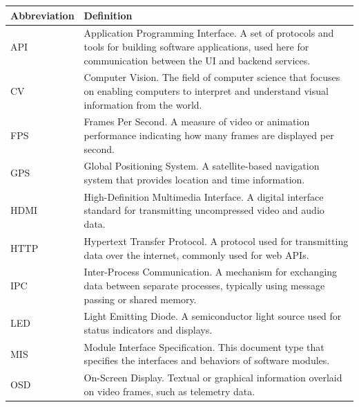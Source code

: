 \documentclass[12pt, titlepage]{article}
\begin{document}
\begin{table}[h]
  \centering
  \begin{tabular}{p{3cm} p{10cm}}
    \toprule
    \textbf{Abbreviation} & \textbf{Definition}                                                                                                                                                  \\
    \midrule
    API                   & Application Programming Interface. A set of protocols and tools for building software applications, used here for communication between the UI and backend services. \\
    CV                    & Computer Vision. The field of computer science that focuses on enabling computers to interpret and understand visual information from the world.                     \\
    FPS                   & Frames Per Second. A measure of video or animation performance indicating how many frames are displayed per second.                                                  \\
    GPS                   & Global Positioning System. A satellite-based navigation system that provides location and time information.                                                          \\
    HDMI                  & High-Definition Multimedia Interface. A digital interface standard for transmitting uncompressed video and audio data.                                               \\
    HTTP                  & Hypertext Transfer Protocol. A protocol used for transmitting data over the internet, commonly used for web APIs.                                                    \\
    IPC                   & Inter-Process Communication. A mechanism for exchanging data between separate processes, typically using message passing or shared memory.                           \\
    LED                   & Light Emitting Diode. A semiconductor light source used for status indicators and displays.                                                                          \\
    MIS                   & Module Interface Specification. This document type that specifies the interfaces and behaviors of software modules.                                                  \\
    OSD                   & On-Screen Display. Textual or graphical information overlaid on video frames, such as telemetry data.                                                                \\

\end{tabular}
\end{table}
\end{document}
